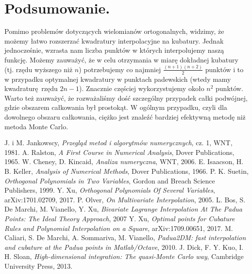 \documentclass[10pt,wide]{mwart}
\theoremstyle{definition}
\begin{document}
\section{Podsumowanie.}
Pomimo problemów dotyczących wielomianów ortogonalnych, widzimy, że możemy łatwo rozszerzać kwadratury interpolacyjne na kubatury. Jednak jednocześnie, wzrasta nam liczba punktów w których interpolujemy naszą funkcję.
Możemy zauważyć, że w celu otrzymania w miarę dokładnej kubatury (tj. rzędu wyższego niż \(n\)) potrzebujemy co najmniej \(\frac{(n+1)(n+2)}{2}\) punktów i to w przypadku optymalnej kwadratury w punktach padewskich (wtedy mamy kwadraturę rzędu \(2n-1\)).
Znacznie częściej wykorzystujemy około \(n^2\) punktów. Warto też zauważyć, że rozważaliśmy dość szczególny przypadek całki podwójnej, gdzie obszarem całkowania był prostokąt.
W ogólnym przypadku, czyli dla dowolnego obszaru całkowania, ciężko jest znaleźć bardziej efektywną metodę niż metoda Monte Carlo.
\begin{thebibliography}{9}
\itemsep10pt
 J. i M. Jankowscy, \emph{Przegląd metod i algorytmów numerycznych}, cz. 1, WNT, 1981.
 A. Ralston, \emph{A First Course in Numerical Analysis}, Dover Publications, 1965.
 W. Cheney, D. Kincaid, \emph{Analiza numeryczna}, WNT, 2006.
 E. Isaacson, H. B. Keller, \emph{Analysis of Numerical Methods}, Dover Publications, 1966.
 P. K. Suetin, \emph{Orthogonal Polynomials in Two Variables}, Gordon and Breach Science Publishers, 1999.
 Y. Xu, \emph{Orthogonal Polynomials Of Several Variables}, arXiv:1701.02709, 2017.
 P. Olver, \emph{On Multivariate Interpolation}, 2005.
 L. Bos, S. De Marchi, M. Vianello, Y. Xu, \emph{Bivariate Lagrange Interpolation At The Padua Points: The Ideal Theory Approach}, 2007
 Y. Xu, \emph{Optimal points for Cubature Rules and Polynomial Interpolation on a Square}, arXiv:1709.00651, 2017.
 M. Caliari, S. De Marchi, A. Sommariva, M. Vianello, \emph{Padua2DM: fast interpolation and cubature at the Padua points in Matlab/Octave}, 2010.
 J. Dick, F. Y. Kuo, I. H. Sloan, \emph{High-dimensional integration: The quasi-Monte Carlo way}, Cambridge University Press, 2013.
\end{thebibliography}
\end{document}
